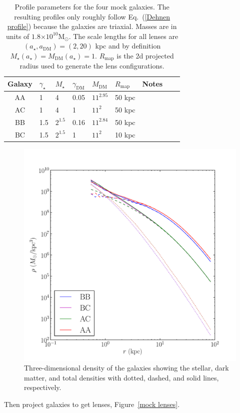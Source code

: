\documentclass[usenatbib,onecolumn,galley]{mn2e}
\newcommand{\Rmap}{\ensuremath{R_\mathrm{map}}}
\newcommand{\Msun}{\ensuremath{\mathrm{M}_\odot}}
\newcommand{\figref}[1] {Figure~\ref{#1}}
\newcommand{\eqnref}[1] {Eq.~(\ref{#1})}
\newcommand{\e}[1]{\ensuremath{\times 10^{#1}}}
\begin{document}
\begin{table}
\begin{center}
\begin{tabular}{cllllllll}
Galaxy & $\gamma_\star$ & $M_\star$ & $\gamma_\mathrm{DM}$ & $M_\mathrm{DM}$ & $\Rmap$ & Notes\\
\hline
AA & 1 & 4 & 0.05 & $11^{2.95}$ & 50 kpc & \\
AC & 1 & 4 & 1 & $11^2$ & 50 kpc & \\
BB & 1.5 & $2^{1.5}$ & 0.16 & $11^{2.84}$ & 50 kpc & \\
BC & 1.5 & $2^{1.5}$ & 1 & $11^2$ & 10 kpc & 
\end{tabular}
\end{center}
\caption{Profile parameters for the four mock galaxies. The resulting profiles only roughly follow
\eqnref{Dehnen profile} because the galaxies are triaxial. Masses are in units of $1.8\e{10}\Msun$. The scale lengths for
all lenses are $(a_\star,a_\mathrm{DM})=(2,20)$ kpc and by definition
$M_\star(a_\star) = M_\mathrm{DM}(a_\star) = 1$. $\Rmap$ is the 2d projected radius used to generate the lens configurations.}
\label{mock galaxy params}
\end{table}

\begin{figure}
\begin{center}
\includegraphics[width=.5\columnwidth]{MockGalProfile-a.pdf}
\end{center}
\caption{Three-dimensional density of the galaxies showing the
  stellar, dark matter, and total densities with dotted, dashed, and
  solid lines, respectively.}
\label{mock galaxies}
\end{figure}

Then project galaxies to get lenses, \figref{mock lenses}.
\end{document}

